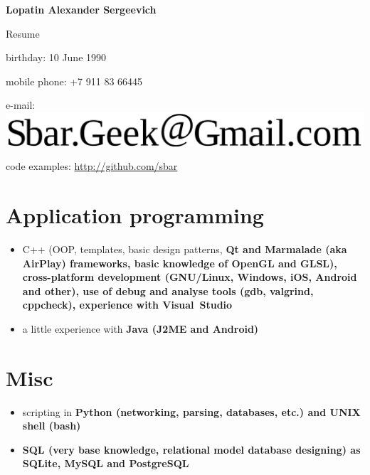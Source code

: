 \begin{center}
\fontsize{16pt}{14pt}\selectfont
\bfseries Lopatin Alexander Sergeevich\mdseries

\fontsize{14pt}{14pt}\selectfont
Resume
\end{center}

{
\fontsize{12pt}{12pt}\selectfont
\begin{flushright}
\item birthday: 10 June 1990
\item mobile phone: +7 911 83 66445
\item e-mail: \includegraphics[scale=0.2]{email}
\item code examples: \url{http://github.com/sbar}
\end{flushright}
}

\section{Application programming}
\begin{itemize}
\item C++ (OOP, templates, basic design patterns,
\bfseries Qt \mdseries and
\bfseries Marmalade \mdseries (aka \bfseries AirPlay\mdseries) frameworks,
basic knowledge of \bfseries OpenGL \mdseries and \bfseries GLSL\mdseries),
cross-platform development
(\bfseries GNU/Linux\mdseries, Windows, iOS,
\bfseries Android \mdseries and other),
use of debug and analyse tools (gdb, valgrind, cppcheck),
experience with Visual~Studio
\item a little experience with \bfseries Java \mdseries (J2ME and Android)
\end{itemize}

\section{Misc}
\begin{itemize}
\item scripting in \bfseries Python \mdseries
(networking, parsing, databases, etc.) and
\bfseries UNIX shell (bash)\mdseries
\item \bfseries SQL \mdseries
(very base knowledge, relational model database designing)
as SQLite, MySQL and PostgreSQL
\end{itemize}

